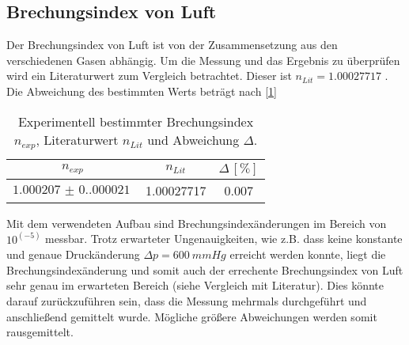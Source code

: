 \subsection{Brechungsindex von Luft}
Der Brechungsindex von Luft ist von der Zusammensetzung aus den verschiedenen Gasen abhängig. Um die Messung und das Ergebnis zu überprüfen wird
ein Literaturwert zum Vergleich betrachtet. Dieser ist $n_{Lit} = 1.00027717$ \cite{n_luft}. Die Abweichung des bestimmten Werts beträgt nach \autoref{1}
\begin{table}[H]
    \centering
    \caption{Experimentell bestimmter Brechungsindex $n_{exp}$, Literaturwert $n_{Lit}$ und Abweichung $\Delta$.}
    \begin{tabular}{c c c}
        \toprule
        $n_{exp}$ & $n_{Lit}$ & $\Delta\,[\unit{\%}]$\\
        \midrule
        $\SI{1.000207(0.000021)}{}$ & 1.00027717 & 0.007\\
        \bottomrule
    \end{tabular}
    \label{tab:abw1}
\end{table}
Mit dem verwendeten Aufbau sind Brechungsindexänderungen im Bereich von $10^(-5)$ messbar. Trotz erwarteter Ungenauigkeiten, wie z.B. 
dass keine konstante und genaue Druckänderung $\Delta p = \SI{600}{mmHg}$ erreicht werden konnte, liegt die Brechungsindexänderung und somit auch 
der errechente Brechungsindex von Luft sehr genau im erwarteten Bereich (siehe Vergleich mit Literatur). Dies könnte darauf zurückzuführen sein, dass die
Messung mehrmals durchgeführt und anschließend gemittelt wurde. Mögliche größere Abweichungen werden somit rausgemittelt.
